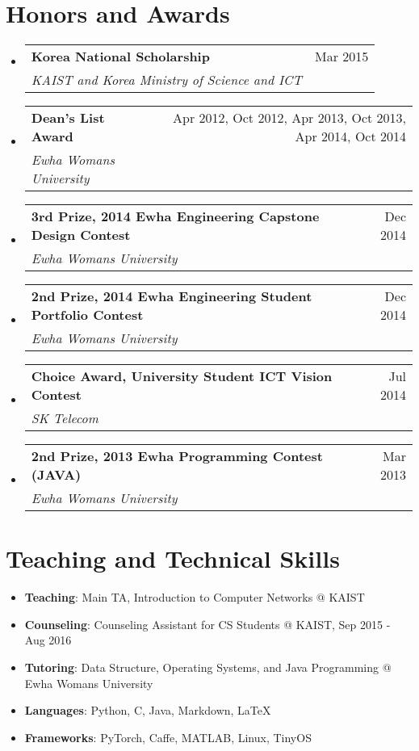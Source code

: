 \documentclass[letterpaper,oneside,11pt]{article}
\makeatletter
\newcommand{\resumeItem}[2]{
  \item\small{
    \textbf{#1}{: #2 \vspace{-2pt}}
  }
}
\newcommand{\resumeSubheading}[4]{
  \vspace{-2pt}\item
    \begin{tabularx}{0.97\textwidth}[t]{X@{\hspace{-5pt}}r}
      \textbf{#1} & #2 \\
      \textit{\small#3} & \small #4 \\
    \end{tabularx}\vspace{-6pt}
}
\newcommand{\awardsSubheading}[4]{
  \resumeSubheading{#1}{#2}{#3}{#4}\vspace{0pt}
}
\newcommand{\resumeSubHeadingListStart}{\begin{itemize}[leftmargin=*]}
\newcommand{\resumeSubHeadingListEnd}{\end{itemize}}
\makeatother
\begin{document}
\section{Honors and Awards}
  \resumeSubHeadingListStart
    \awardsSubheading{Korea National Scholarship}{Mar 2015}
    {KAIST and Korea Ministry of Science and ICT}{}
    \awardsSubheading{Dean's List Award}{Apr 2012, Oct 2012, Apr 2013, Oct 2013, Apr 2014, Oct 2014}
    {Ewha Womans University}{}
    \awardsSubheading{3rd Prize, 2014 Ewha Engineering Capstone Design Contest}{Dec 2014}
    {Ewha Womans University}{}
    \awardsSubheading{2nd Prize, 2014 Ewha Engineering Student Portfolio Contest}{Dec 2014}
    {Ewha Womans University}{}
    \awardsSubheading{Choice Award, University Student ICT Vision Contest}{Jul 2014}
    {SK Telecom}{}
    \awardsSubheading{2nd Prize, 2013 Ewha Programming Contest (JAVA)}{Mar 2013}
    {Ewha Womans University}{}
  \resumeSubHeadingListEnd

%
\section{Teaching and Technical Skills}
 \resumeSubHeadingListStart
   \resumeItem{Teaching}{Main TA, Introduction to Computer Networks @ KAIST}
   \resumeItem{Counseling}{Counseling Assistant for CS Students @ KAIST, Sep 2015 - Aug 2016}
   \resumeItem{Tutoring}{Data Structure, Operating Systems, and Java Programming @ Ewha Womans University}
   \resumeItem{Languages}{Python, C, Java, Markdown, \LaTeX}
   \resumeItem{Frameworks}{PyTorch, Caffe, MATLAB, Linux, TinyOS}
 \resumeSubHeadingListEnd
\end{document}
